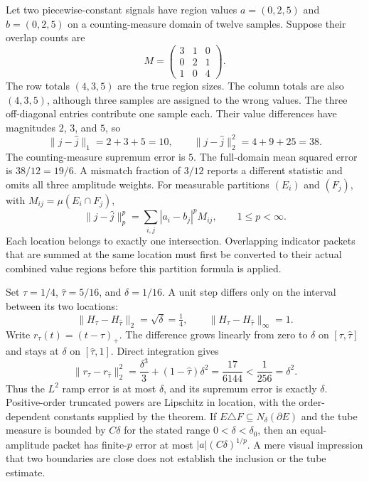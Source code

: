 Let two piecewise-constant signals have region values $a=(0,2,5)$ and $b=(0,2,5)$ on a counting-measure domain of twelve samples. Suppose their overlap counts are
\[
M=\begin{pmatrix}3&1&0\\0&2&1\\1&0&4\end{pmatrix}.
\]
The row totals $(4,3,5)$ are the true region sizes. The column totals are also $(4,3,5)$, although three samples are assigned to the wrong values.
The three off-diagonal entries contribute one sample each. Their value differences have magnitudes $2$, $3$, and $5$, so
\[
\|j-\widehat j\|_1=2+3+5=10,\qquad
\|j-\widehat j\|_2^2=4+9+25=38.
\]
The counting-measure supremum error is $5$. The full-domain mean squared error is $38/12=19/6$. A mismatch fraction of $3/12$ reports a different statistic and omits all three amplitude weights.
For measurable partitions $(E_i)$ and $(F_j)$, with $M_{ij}=\mu(E_i\cap F_j)$,
\[
\|j-\widehat j\|_p^p=\sum_{i,j}|a_i-b_j|^pM_{ij},\qquad 1\le p<\infty.
\]
Each location belongs to exactly one intersection. Overlapping indicator packets that are summed at the same location must first be converted to their actual combined value regions before this partition formula is applied.

Set $\tau=1/4$, $\widehat\tau=5/16$, and $\delta=1/16$. A unit step differs only on the interval between its two locations:
\[
\|H_\tau-H_{\widehat\tau}\|_2=\sqrt\delta=\tfrac14,
\qquad \|H_\tau-H_{\widehat\tau}\|_\infty=1.
\]
Write $r_\tau(t)=(t-\tau)_+$. The difference grows linearly from zero to $\delta$ on $[\tau,\widehat\tau]$ and stays at $\delta$ on $[\widehat\tau,1]$. Direct integration gives
\[
\|r_\tau-r_{\widehat\tau}\|_2^2
=\frac{\delta^3}{3}+(1-\widehat\tau)\delta^2
=\frac{17}{6144}<\frac1{256}=\delta^2.
\]
Thus the $L^2$ ramp error is at most $\delta$, and its supremum error is exactly $\delta$. Positive-order truncated powers are Lipschitz in location, with the order-dependent constants supplied by the theorem.
If $E\triangle F\subseteq N_\delta(\partial E)$ and the tube measure is bounded by $C\delta$ for the stated range $0<\delta<\delta_0$, then an equal-amplitude packet has finite-$p$ error at most $|a|(C\delta)^{1/p}$. A mere visual impression that two boundaries are close does not establish the inclusion or the tube estimate.

